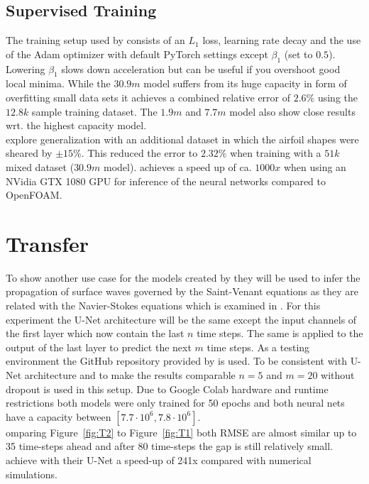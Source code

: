 \documentclass[acmtog]{techreportacmart}
\begin{document}
\subsection{Supervised Training}
The training setup used by \cite{Thuerey20} consists of an $L_1$ loss, learning rate decay and the 
use of the Adam optimizer \cite{kingma2014adam} with default PyTorch settings except $\beta_1$ 
(set to $0.5$). Lowering $\beta_1$ slows down acceleration but can be 
useful if you overshoot good local minima. 
While the $30.9m$ model suffers from its huge capacity in form of overfitting 
small data sets it achieves a combined relative error of $2.6\%$ using the $12.8k$ sample training 
dataset. The $1.9m$ and $7.7m$ model also show close results wrt. the highest capacity model.\\
\cite{Thuerey20} explore generalization with an additional dataset in which the airfoil shapes 
were sheared by $\pm15\%$. This reduced the error to $2.32\%$ when training 
with a $51k$ mixed dataset ($30.9m$ model). 
\cite{Thuerey20} achieves a speed up of ca. $1000x$ when using an NVidia GTX 1080 
GPU for inference of the neural networks compared to OpenFOAM.

\section{Transfer}
To show another use case for the models created by \cite{Thuerey20} they will be used to infer 
the propagation of surface waves governed by the Saint-Venant equations as they are related with 
the Navier-Stokes equations which is examined in \cite{Fotiadis2020}. For this experiment the 
U-Net architecture will be the same except the input channels of the first layer which now contain 
the last $n$ time steps. The same is applied to the output of the last layer to predict the next 
$m$ time steps. As a testing environment the GitHub repository provided by \cite{Fotiadis2020} is 
used. To be consistent with \cite{Fotiadis2020} U-Net architecture and to make the results comparable 
$n=5$ and $m=20$ without dropout is used in this setup. Due to Google Colab hardware and runtime 
restrictions both models were only trained for 50 epochs and both neural nets have a capacity 
between $[7.7 \cdot 10^6, 7.8 \cdot 10^6]$.\\
omparing Figure~\ref{fig:T2} to Figure~\ref{fig:T1} both RMSE are almost similar up to 35 
time-steps ahead and after 80 time-steps the gap is still relatively small. 
\cite{Fotiadis2020} achieve with their U-Net a speed-up of 241x compared with numerical 
simulations. 
\end{document}
